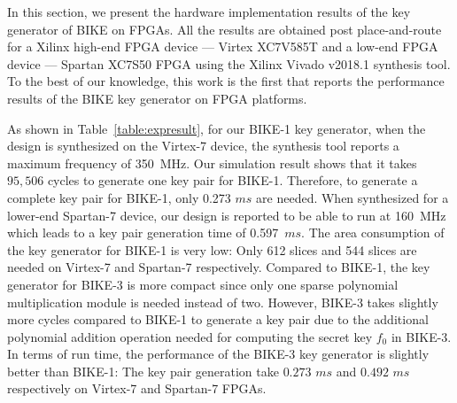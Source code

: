 \documentclass[runningheads]{llncs}
\begin{document}
%
In this section, we present the hardware implementation results of the
key generator of BIKE on FPGAs.
All the results are obtained post place-and-route for a
Xilinx high-end FPGA device --- Virtex XC7V585T
and a low-end FPGA device --- Spartan XC7S50 FPGA
using the Xilinx Vivado v2018.1 synthesis tool.
To the best of our knowledge, this work is the first
that reports the performance results of the BIKE key generator
on FPGA platforms.

As shown in Table~\ref{table:expresult},
for our BIKE-1 key generator,
when the design is synthesized on the Virtex-7 device,
the synthesis tool reports a maximum frequency of 350~MHz.
Our simulation result shows that it takes $95,506$ cycles
to generate one key pair for BIKE-1.
Therefore, to generate a complete key pair for BIKE-1,
only 0.273 $ms$ are needed.
When synthesized for a lower-end Spartan-7 device,
our design is reported to be able to run at 160~MHz
which leads to a key pair generation time of 0.597~$ms$.
The area consumption of the key generator
for BIKE-1 is very low: Only 612 slices and 544 slices
are needed on Virtex-7 and Spartan-7 respectively.
Compared to BIKE-1, the key generator for BIKE-3
is more compact since only one sparse polynomial
multiplication module is needed instead of two.
However, BIKE-3 takes slightly more cycles
compared to BIKE-1 to generate a key pair
due to the additional polynomial addition operation
needed for computing the secret key $f_0$
in BIKE-3.
In terms of run time,
the performance of the BIKE-3 key generator
is slightly better than BIKE-1:
The key pair generation take $0.273$ $ms$ and $0.492$ $ms$
respectively on Virtex-7 and Spartan-7 FPGAs.
\end{document}
